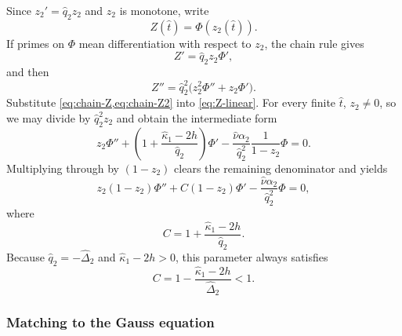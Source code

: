 Since $z_2'=\hat q_2z_2$ and $z_2$ is monotone, write
\begin{equation*}
Z(\hat t)=\Phi(z_2(\hat t)).
\end{equation*}
If primes on $\Phi$ mean differentiation with respect to $z_2$, the chain rule gives
\begin{equation}
\label{eq:chain-Z}
Z'=\hat q_2z_2\Phi',
\end{equation}
and then
\begin{equation}
\label{eq:chain-Z2}
Z''=\hat q_2^2\bigl(z_2^2\Phi''+z_2\Phi'\bigr).
\end{equation}
Substitute \cref{eq:chain-Z,eq:chain-Z2} into \cref{eq:Z-linear}. For every finite $\hat t$, $z_2\neq0$, so we may divide by $\hat q_2^2z_2$ and obtain the intermediate form
\begin{equation*}
z_2\Phi''+\left(1+\frac{\hat\kappa_1-2h}{\hat q_2}\right)\Phi'
-\frac{\hat\nu\alpha_2}{\hat q_2^2}\frac{1}{1-z_2}\Phi=0.
\end{equation*}
Multiplying through by $(1-z_2)$ clears the remaining denominator and yields
\begin{equation}
\label{eq:hypergeometric}
z_2(1-z_2)\Phi''+C(1-z_2)\Phi'
-\frac{\hat\nu\alpha_2}{\hat q_2^2}\Phi=0,
\end{equation}
where
\begin{equation}
\label{eq:C-generalized}
C=1+\frac{\hat\kappa_1-2h}{\hat q_2}.
\end{equation}
Because $\hat q_2=-\hat\Delta_2$ and $\hat\kappa_1-2h>0$, this parameter always satisfies
\begin{equation*}
C=1-\frac{\hat\kappa_1-2h}{\hat\Delta_2}<1.
\end{equation*}

\subsubsection{Matching to the Gauss equation}

